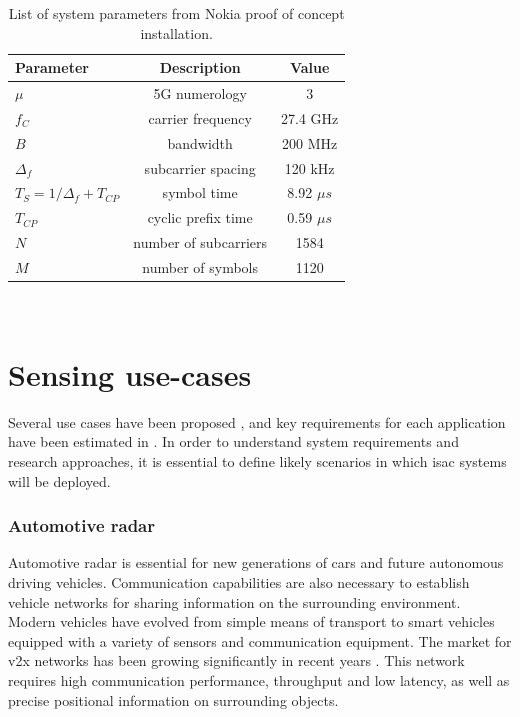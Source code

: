 	\begin{table}[H]
		\centering 
		\caption{List of system parameters from Nokia proof of concept installation.}
		\label{table:PoCparams}
		\begin{tabular}{|p{9em} c c |}
			\hline
			\rowcolor{bluepoli!40} %
			\textbf{Parameter} & \textbf{Description} & \textbf{Value}  \T\B \\
			\hline \hline
			$\mu$ & 5G numerology & 3 \T\B \\
			$f_C$ & carrier frequency & 27.4 GHz \T\B \\
			$B$ & bandwidth & 200 MHz \T\B\\
			$\Delta_f$ & subcarrier spacing & 120 kHz  \T\B\\
			$T_S = 1/\Delta_f + T_{CP}$ & symbol time & 8.92 $\mu s$  \T\B\\
			$T_{CP}$ & cyclic prefix time & 0.59 $\mu s$  \T\B\\
			$N$ & number of subcarriers & 1584  \T\B\\
			$M$ & number of symbols & 1120  \B\\
			
			\hline
		\end{tabular}
		\\[10pt]
	\end{table}
	
	


\section{Sensing use-cases}

	Several use cases have been proposed \cite{Mandelli_Henninger_Bauhofer_Wild_2023}, \cite{Wang_Varshney_Gentile_Blandino_Chuang_Golmie_2022} and  key requirements for each application have been estimated in \cite{Wild_Braun_Viswanathan_2021}.
	In order to understand system requirements and research approaches, it is essential to define likely scenarios in which \gls{isac} systems will be deployed.
	
	\subsubsection{Automotive radar}
	
	Automotive radar is essential for new generations of cars and future autonomous driving vehicles.
	Communication capabilities are also necessary to establish vehicle networks for sharing information on the surrounding environment.
	Modern vehicles have evolved from simple means of transport to smart vehicles equipped with a variety of sensors and communication equipment.
	The market for \gls{v2x} networks has been growing significantly in recent years \cite{Liu_Masouros_2021}.
	This network requires high communication performance, throughput and low latency, as well as precise positional information on surrounding objects.
	
